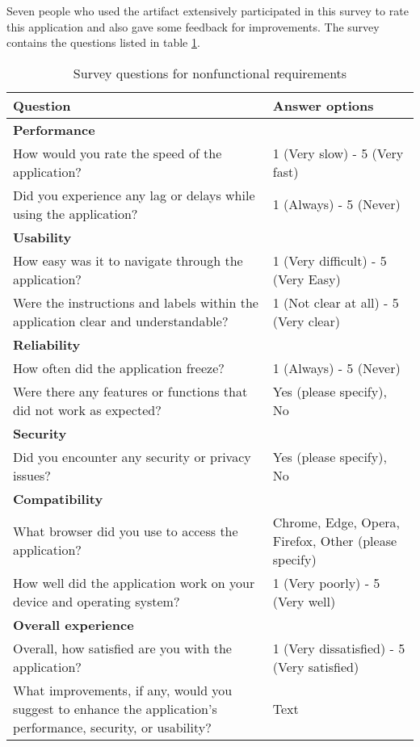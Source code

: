 Seven people who used the artifact extensively participated in this survey to rate this application and also gave some feedback for improvements.
The survey contains the questions listed in table \ref{tab:non-func-req}.

\begin{table}[!h]
    \centering
    \begin{tabular}{p{8cm} p{6cm}}
    \hline
        \textbf{Question} & \textbf{Answer options} \\ 
     \hline
        \textbf{Performance} & \\
        How would you rate the speed of the application? & 1 (Very slow) - 5 (Very fast) \\
        Did you experience any lag or delays while using the application? & 1 (Always) - 5 (Never) \\
     \hline
        \textbf{Usability} & \\
        How easy was it to navigate through the application? & 1 (Very difficult) - 5 (Very Easy) \\
        Were the instructions and labels within the application clear and understandable? & 1 (Not clear at all) - 5 (Very clear) \\
     \hline
        \textbf{Reliability} & \\
        How often did the application freeze? & 1 (Always) - 5 (Never) \\
        Were there any features or functions that did not work as expected? & Yes (please specify), No \\
     \hline
        \textbf{Security} & \\
        Did you encounter any security or privacy issues? & Yes (please specify), No \\
     \hline
        \textbf{Compatibility} & \\
        What browser did you use to access the application? & Chrome, Edge, Opera, Firefox, Other (please specify) \\
        How well did the application work on your device and operating system? & 1 (Very poorly) - 5 (Very well) \\
     \hline
        \textbf{Overall experience} & \\
        Overall, how satisfied are you with the application? & 1 (Very dissatisfied) - 5 (Very satisfied) \\
        What improvements, if any, would you suggest to enhance the application’s performance, security, or usability? & Text \\
        
    \end{tabular}
    \caption{Survey questions for nonfunctional requirements}
    \label{tab:non-func-req}
\end{table}

